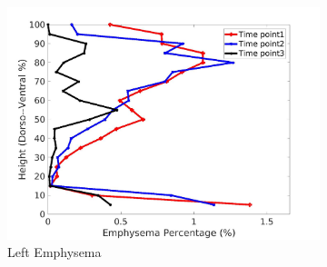 \begin{figure}[H]
\begin{subfigure}{.4\linewidth}
  \includegraphics[width=\linewidth,trim={{.0\wd0} {.0\wd0} {.0\wd0} {.0\wd0}},clip]{Appendix/Image_AppexA/DorsoToVentral/IPF2LeftLungEmphysemaDiseaseDorsoToVentral.jpg} %
  \caption{Left Emphysema}
  \label{fig:IPF2DiseaseDorsoToVentral-g} 
\end{subfigure} 
\begin{subfigure}{.4\linewidth}%

\end{subfigure}
\end{figure}

